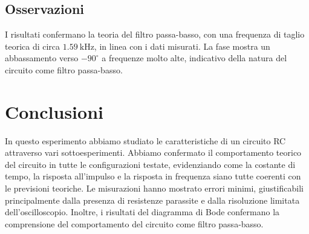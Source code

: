 \documentclass[a4paper,12pt]{article}
\begin{document}
\subsection{Osservazioni}
I risultati confermano la teoria del filtro passa-basso, con una frequenza di taglio teorica di circa \(\SI{1.59}{\kilo\hertz}\), in linea con i dati misurati. La fase mostra un abbassamento verso \(-90^\circ\) a frequenze molto alte, indicativo della natura del circuito come filtro passa-basso.


\section{Conclusioni}
In questo esperimento abbiamo studiato le caratteristiche di un circuito RC attraverso vari sottoesperimenti. Abbiamo confermato il comportamento teorico del circuito in tutte le configurazioni testate, evidenziando come la costante di tempo, la risposta all'impulso e la risposta in frequenza siano tutte coerenti con le previsioni teoriche. Le misurazioni hanno mostrato errori minimi, giustificabili principalmente dalla presenza di resistenze parassite e dalla risoluzione limitata dell'oscilloscopio. Inoltre, i risultati del diagramma di Bode confermano la comprensione del comportamento del circuito come filtro passa-basso.
\end{document}

